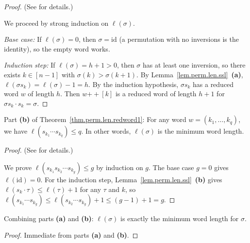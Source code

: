 \begin{proof}
\leanok
(See \cite[Exercise 5.2 \textbf{(e)}]{detnotes} for details.)

We proceed by strong induction on $\ell(\sigma)$.

\emph{Base case:} If $\ell(\sigma) = 0$, then $\sigma = \mathrm{id}$
(a permutation with no inversions is the identity), so the empty word works.

\emph{Induction step:} If $\ell(\sigma) = h + 1 > 0$, then $\sigma$ has at least
one inversion, so there exists $k \in [n-1]$ with $\sigma(k) > \sigma(k+1)$.
By Lemma~\ref{lem.perm.len.ssl}~\textbf{(a)},
$\ell(\sigma s_k) = \ell(\sigma) - 1 = h$.
By the induction hypothesis, $\sigma s_k$ has a reduced word $w$ of length $h$.
Then $w \mathbin{+\!+} [k]$ is a reduced word of length $h+1$ for
$\sigma s_k \cdot s_k = \sigma$.
\end{proof}

\begin{theorem}
\label{thm.perm.len.redword1.b}
\leanhelper
\leanok
Part \textbf{(b)} of Theorem~\ref{thm.perm.len.redword1}:
For any word $w = (k_1, \ldots, k_q)$, we have $\ell(s_{k_1} \cdots s_{k_q}) \leq q$.
In other words, $\ell(\sigma)$ is the minimum word length.
\end{theorem}

\begin{proof}
\leanok
(See \cite[Exercise 5.2 \textbf{(g)}]{detnotes} for details.)

We prove $\ell(s_{k_1} s_{k_2} \cdots s_{k_g}) \leq g$ by induction on $g$.
The base case $g = 0$ gives $\ell(\mathrm{id}) = 0$.
For the induction step, Lemma~\ref{lem.perm.len.ssl}~\textbf{(b)} gives
$\ell(s_k \cdot \tau) \leq \ell(\tau) + 1$ for any $\tau$ and $k$,
so $\ell(s_{k_1} \cdots s_{k_g}) \leq \ell(s_{k_2} \cdots s_{k_g}) + 1 \leq (g-1) + 1 = g$.
\end{proof}

\begin{theorem}
\label{thm.perm.len.eq-min}
\leanhelper
\leanok
Combining parts \textbf{(a)} and \textbf{(b)}: $\ell(\sigma)$ is exactly the
minimum word length for $\sigma$.
\end{theorem}

\begin{proof}
\leanok
Immediate from parts \textbf{(a)} and \textbf{(b)}.
\end{proof}


